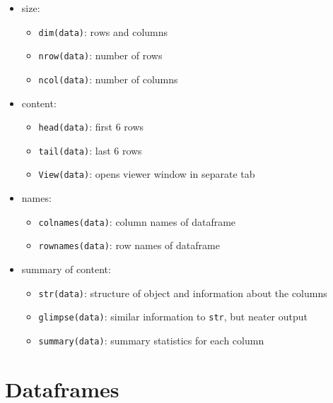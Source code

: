 \documentclass[]{article}
\providecommand{\tightlist}{%
  \setlength{\itemsep}{0pt}\setlength{\parskip}{0pt}}
\begin{document}
\begin{itemize}
\tightlist
\item
  size:

  \begin{itemize}
  \tightlist
  \item
    \texttt{dim(data)}: rows and columns\\
  \item
    \texttt{nrow(data)}: number of rows\\
  \item
    \texttt{ncol(data)}: number of columns
  \end{itemize}
\item
  content:

  \begin{itemize}
  \tightlist
  \item
    \texttt{head(data)}: first 6 rows\\
  \item
    \texttt{tail(data)}: last 6 rows\\
  \item
    \texttt{View(data)}: opens viewer window in separate tab
  \end{itemize}
\item
  names:

  \begin{itemize}
  \tightlist
  \item
    \texttt{colnames(data)}: column names of dataframe\\
  \item
    \texttt{rownames(data)}: row names of dataframe
  \end{itemize}
\item
  summary of content:

  \begin{itemize}
  \tightlist
  \item
    \texttt{str(data)}: structure of object and information about the
    columns\\
  \item
    \texttt{glimpse(data)}: similar information to \texttt{str}, but
    neater output\\
  \item
    \texttt{summary(data)}: summary statistics for each column
  \end{itemize}
\end{itemize}

\newpage

\section{Dataframes}\label{dataframes}
\end{document}
